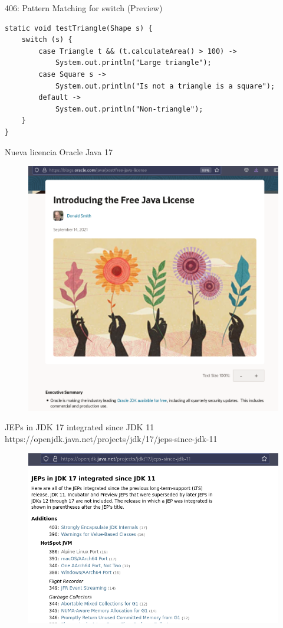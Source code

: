 \documentclass[aspectratio=169]{beamer}
\begin{document}
\begin{frame}[fragile]{406: Pattern Matching for switch (Preview)}

\begin{lstlisting}
static void testTriangle(Shape s) {
    switch (s) {
        case Triangle t && (t.calculateArea() > 100) ->
            System.out.println("Large triangle");
        case Square s ->
            System.out.println("Is not a triangle is a square");
        default ->
            System.out.println("Non-triangle");
    }
}
\end{lstlisting}

\end{frame}
\begin{frame}[fragile]{Nueva licencia Oracle Java 17}

\begin{figure}
\centering
\includegraphics[width=0.7\linewidth]{Images/freejava}
\end{figure}


\end{frame}

\begin{frame}[fragile]{JEPs in JDK 17 integrated since JDK 11}
https://openjdk.java.net/projects/jdk/17/jeps-since-jdk-11
\begin{figure}
\centering
\includegraphics[width=0.7\linewidth]{Images/jepsjava11java17.png}
\end{figure}


\end{frame}
\end{document}
